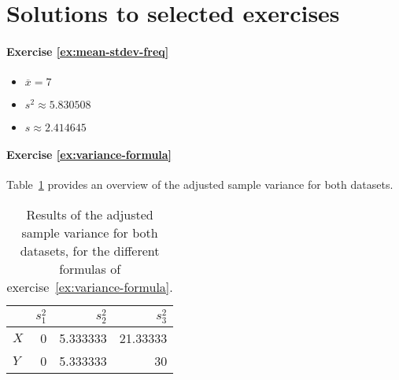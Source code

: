 




\section{Solutions to selected exercises}

\paragraph{Exercise \ref{ex:mean-stdev-freq}}

\begin{itemize}
  \item $\overline{x} = 7$
  \item $s^2 \approx 5.830508$
  \item $s \approx 2.414645$
\end{itemize}

\paragraph{Exercise \ref{ex:variance-formula}}
Table~\ref{tab:opl-variance-ht} provides an overview of the adjusted sample variance for both datasets.

\begin{table}
  \centering
  \begin{tabular}{@{}l|rrr@{}}
    \toprule
      & \textbf{$s^{2}_{1}$} & \textbf{$s^{2}_{2}$} & \textbf{$s^{2}_{3}$} \\
    \midrule                
      \textbf{$ X $} & 0           & 5.333333    & 21.33333    \\ 
      \textbf{$ Y $} & 0           & 5.333333    & 30          \\           
    \bottomrule
  \end{tabular}
  \caption{Results of the adjusted sample variance for both datasets, for the different formulas of exercise~\ref{ex:variance-formula}.}
  \label{tab:opl-variance-ht}
\end{table}

